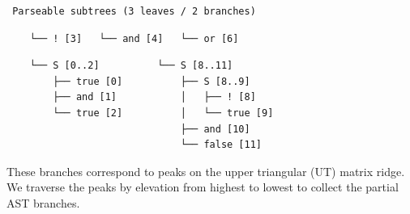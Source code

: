 \documentclass[sigplan,nonacm]{acmart}\settopmatter{printfolios=false,printccs=false,printacmref=false}
\begin{document}
\begin{verbatim}
 Parseable subtrees (3 leaves / 2 branches)
\end{verbatim}
\hspace{0.64cm}\hspace{1.70cm}\hspace{1.98cm}\vspace{-14pt}
\begin{verbatim}
    └── ! [3]   └── and [4]   └── or [6]
\end{verbatim}
\hspace{0.63cm}\hspace{3.4cm}\vspace{-14pt}
\begin{verbatim}
    └── S [0..2]          └── S [8..11]
        ├── true [0]          ├── S [8..9]
        ├── and [1]           │   ├── ! [8]
        └── true [2]          │   └── true [9]
                              ├── and [10]
                              └── false [11]
\end{verbatim}

\noindent These branches correspond to peaks on the upper triangular (UT) matrix ridge. We traverse the peaks by elevation from highest to lowest to collect the partial AST branches.
\end{document}
